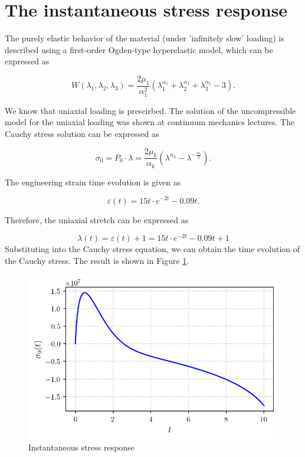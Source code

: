 \documentclass[12pt,a4paper]{article}
\begin{document}
\section{The instantaneous stress response}

The purely elastic behavior of the material (under 'infinitely slow' loading) is described using a first-order Ogden-type hyperelastic model, which can be expressed as 

\begin{equation}
    W(\lambda_1, \lambda_2, \lambda_3) = \frac{2\mu_1}{\alpha_1^2} \left( \lambda_1^{\alpha_1} + \lambda_2^{\alpha_1} + \lambda_3^{\alpha_1} - 3 \right).
\end{equation}

We know that uniaxial loading is prescirbed. The solution of the uncompressible model for the uniaxial loading was shown at continuum mechanics lectures. The Cauchy stress solution can be expressed as

\begin{equation}
\sigma_0 = P_0\cdot\lambda = \frac{2\mu_k}{\alpha_k}(\lambda^{\alpha_k} - \lambda^{-\frac{\alpha_k}{2}}).
\end{equation}

The engineering strain time evolution is given as

\begin{equation}
\varepsilon(t) = 15t\cdot e^{-2t}-0.09t.
\end{equation}

Therefore, the uniaxial stretch can be expressed as

$$
\lambda(t) = \varepsilon(t) + 1 = 15t\cdot e^{-2t}-0.09t + 1
$$
Substituting into the Cauchy stress equation, we can obtain the time evolution of the Cauchy stress. The result is shown in Figure \ref{fig:instantaneous_stress}.
\begin{figure}[H]
    \centering
    \includegraphics[scale=0.8]{figures/elastic_solution.png}
    \caption{Instantaneous stress response}
 \label{fig:instantaneous_stress}
\end{figure}
\end{document}
